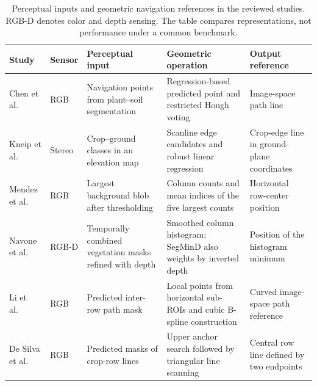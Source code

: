\begin{table}[p]
    \centering
    \footnotesize
    \setlength{\tabcolsep}{3pt}
    \renewcommand{\arraystretch}{1.2}
    \caption{Perceptual inputs and geometric navigation references in the
    reviewed studies. RGB-D denotes color and depth sensing. The table
    compares representations, not performance under a common benchmark.}
    \label{tab:confronto_riferimenti_geometrici}
    \begin{tabularx}{\textwidth}{@{}>{\raggedright\arraybackslash}p{}
        >{\raggedright\arraybackslash}p{}
        >{\raggedright\arraybackslash}X
        >{\raggedright\arraybackslash}X
        >{\raggedright\arraybackslash}p{}@{}}
        \toprule
        Study & Sensor & Perceptual input & Geometric operation & Output reference \\
        \midrule
        Chen et al.\ \cite{chen2021navigation}
        & RGB
        & Navigation points from plant--soil segmentation
        & Regression-based predicted point and restricted Hough voting
        & Image-space path line \\
        \addlinespace
        Kneip et al.\ \cite{kneip2020cropedge}
        & Stereo
        & Crop--ground classes in an elevation map
        & Scanline edge candidates and robust linear regression
        & Crop-edge line in ground-plane coordinates \\
        \addlinespace
        Mendez et al.\ \cite{mendez2023vineyards}
        & RGB
        & Largest background blob after thresholding
        & Column counts and mean indices of the five largest counts
        & Horizontal row-center position \\
        \addlinespace
        Navone et al.\ \cite{navone2025gpsfree}
        & RGB-D
        & Temporally combined vegetation masks refined with depth
        & Smoothed column histogram; SegMinD also weights by inverted depth
        & Position of the histogram minimum \\
        \addlinespace
        Li et al.\ \cite{li2022multiroi}
        & RGB
        & Predicted inter-row path mask
        & Local points from horizontal sub-ROIs and cubic B-spline construction
        & Curved image-space path reference \\
        \addlinespace
        De Silva et al.\ \cite{silva2023rowdetection}
        & RGB
        & Predicted masks of crop-row lines
        & Upper anchor search followed by triangular line scanning
        & Central row line defined by two endpoints \\
        \bottomrule
    \end{tabularx}
\end{table}
\clearpage

